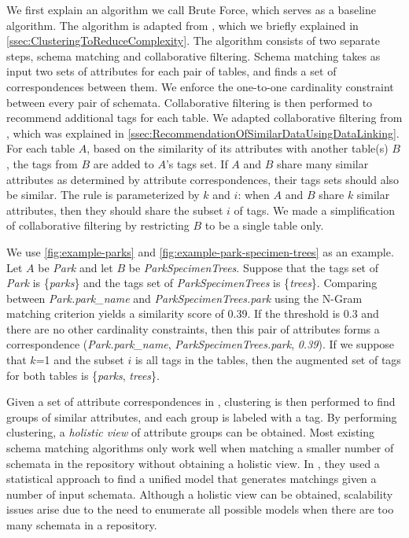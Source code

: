 We first explain an algorithm we call Brute Force, which serves as a baseline algorithm. The algorithm is adapted from \cite{Smith2011Unity}, which we briefly explained in \autoref{ssec:ClusteringToReduceComplexity}. The algorithm consists of two separate steps, schema matching and collaborative filtering. Schema matching takes as input two sets of attributes for each pair of tables, and finds a set of correspondences between them. We enforce the one-to-one cardinality constraint between every pair of schemata. Collaborative filtering is then performed to recommend additional tags for each table. We adapted collaborative filtering from \cite{conf/esws/EllefiBDT16}, which was explained in \autoref{ssec:RecommendationOfSimilarDataUsingDataLinking}. For each table $A$, based on the similarity of its attributes with another table(s) $B$, the tags from $B$ are added to $A$'s tags set. If $A$ and $B$ share many similar attributes as determined by attribute correspondences, their tags sets should also be similar. The rule is parameterized by $k$ and $i$: when $A$ and $B$ share $k$ similar attributes, then they should share the subset $i$ of tags. We made a simplification of collaborative filtering by restricting $B$ to be a single table only.

We use \autoref{fig:example-parks} and \autoref{fig:example-park-specimen-trees} as an example. Let $A$ be \textit{Park} and let $B$ be \textit{ParkSpecimenTrees}. Suppose that the tags set of \textit{Park} is \{\textit{parks}\} and the tags set of \textit{ParkSpecimenTrees} is \{\textit{trees}\}. Comparing between \textit{Park.park\_name} and \textit{ParkSpecimenTrees.park} using the N-Gram matching criterion yields a similarity score of 0.39. If the threshold is 0.3 and there are no other cardinality constraints, then this pair of attributes forms a correspondence (\textit{Park.park\_name}, \textit{ParkSpecimenTrees.park}, \textit{0.39}). If we suppose that $k$=1 and the subset $i$ is all tags in the tables, then the augmented set of tags for both tables is \{\textit{parks}, \textit{trees}\}.

Given a set of attribute correspondences in \cite{Smith2011Unity}, clustering is then performed to find groups of similar attributes, and each group is labeled with a tag. By performing clustering, a \textit{holistic view} of attribute groups can be obtained. Most existing schema matching algorithms only work well when matching a smaller number of schemata in the repository without obtaining a holistic view. In \cite{10.1145/2396761.2398468}, they used a statistical approach to find a unified model that generates matchings given a number of input schemata. Although a holistic view can be obtained, scalability issues arise due to the need to enumerate all possible models when there are too many schemata in a repository.

